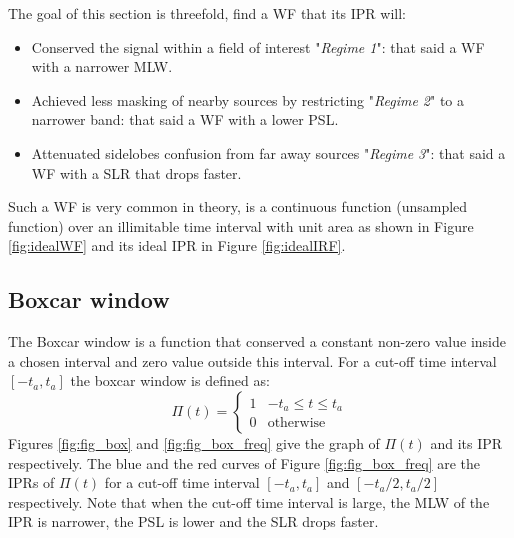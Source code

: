 \documentclass[useAMS,usenatbib]{mn2e}
\begin{document}
The goal of this section is threefold, find a WF that its IPR will:
\begin{itemize}
  \item Conserved the signal within a field of interest "\textit{Regime 1}": that said a WF with a narrower MLW.
  \item Achieved less masking of nearby sources by restricting "\textit{Regime 2}" to a narrower band: that said a WF with a lower PSL.
  \item Attenuated sidelobes confusion from far away sources "\textit{Regime 3}": that said a WF with a SLR that drops faster.
\end{itemize}
Such a WF is very common in theory, is a continuous 
function (unsampled function) over an illimitable time interval with unit area as shown in Figure \ref{fig:idealWF} and its ideal IPR in 
Figure \ref{fig:idealIRF}. 

\subsection{Boxcar window}
The Boxcar window is a function that  conserved a constant non-zero value  inside a chosen  interval and zero value outside this interval. 
For a cut-off time interval  $[-t_a,t_a]$ the boxcar window is defined as:
\begin{equation}
\Pi(t)=\left\{
\begin{array}{rl}
1 & \mbox{$-t_a \leq t \leq t_a$} \\
0 & \mbox{otherwise}
\end{array}\right.
\end{equation}
Figures \ref{fig:fig_box} and \ref{fig:fig_box_freq} give the graph of $\Pi(t)$ and its IPR  respectively. The blue and 
the red curves of Figure \ref{fig:fig_box_freq} are the IPRs of $\Pi(t)$ for a cut-off time interval $[-t_a, t_a]$ and 
$[-t_a/2,t_a/2]$ respectively. Note that when the cut-off time interval is large, the MLW of the IPR is 
narrower, the PSL is lower and the SLR drops faster.
\end{document}
